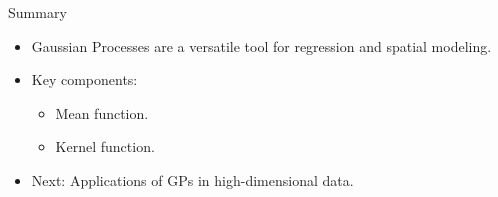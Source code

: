 \documentclass[11pt,handout,aspectratio=169]{beamer}
\begin{document}
\begin{frame}{Summary}
\begin{itemize}
    \item Gaussian Processes are a versatile tool for regression and spatial modeling.
    \item Key components:
    \begin{itemize}
        \item Mean function.
        \item Kernel function.
    \end{itemize}
    \item Next: Applications of GPs in high-dimensional data.
\end{itemize}
\end{frame}
\end{document}
